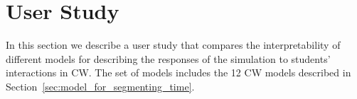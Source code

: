 \documentclass[letterpaper]{article} %
\begin{document}



\section{User Study}
\label{sec:interpretability_results}



In this section we describe a user study that compares the interpretability of different models for describing the responses of the simulation to students' interactions in CW.
The set of models includes the 12 CW models described in Section~\ref{sec:model_for_segmenting_time}.%


\end{document}

